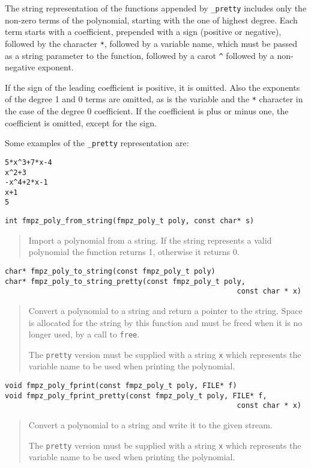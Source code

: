 \documentclass[a4paper,10pt]{article}
\newcommand{\code}{\lstinline}
\begin{document}
The string representation of the functions appended by \code{_pretty} includes only the non-zero terms of the polynomial, starting with the one of highest degree. Each term starts with a coefficient, prepended with a sign (positive or negative), followed by the character \code{*}, followed by a variable name, which must be passed as a string parameter to the function, followed by a carot \code{^} followed by a non-negative exponent.

If the sign of the leading coefficient is positive, it is omitted. Also the exponents of the degree 1 and 0 terms are omitted, as is the variable and the \code{*} character in the case of the degree 0 coefficient. If the coefficient is plus or minus one, the coefficient is omitted, except for the sign.

Some examples of the \code{_pretty} representation are:

\begin{lstlisting}
5*x^3+7*x-4
x^2+3
-x^4+2*x-1
x+1
5
\end{lstlisting}

\begin{lstlisting}
int fmpz_poly_from_string(fmpz_poly_t poly, const char* s)
\end{lstlisting}
\begin{quote}
Import a polynomial from a string. If the string represents a valid polynomial the function returns 1, otherwise it returns 0.
\end{quote}

\begin{lstlisting}
char* fmpz_poly_to_string(const fmpz_poly_t poly)
char* fmpz_poly_to_string_pretty(const fmpz_poly_t poly, 
                                                      const char * x)
\end{lstlisting}
\begin{quote}
Convert a polynomial to a string and return a pointer to the string. Space is allocated for the string by this function and must be freed when it is no longer used, by a call to \code{free}.

The \code{pretty} version must be supplied with a string \code{x} which represents the variable name to be used when printing the polynomial.
\end{quote}

\begin{lstlisting}
void fmpz_poly_fprint(const fmpz_poly_t poly, FILE* f)
void fmpz_poly_fprint_pretty(const fmpz_poly_t poly, FILE* f, 
                                                      const char * x)
\end{lstlisting}
\begin{quote}
Convert a polynomial to a string and write it to the given stream. 

The \code{pretty} version must be supplied with a string \code{x} which represents the variable name to be used when printing the polynomial.
\end{quote}
\end{document}
